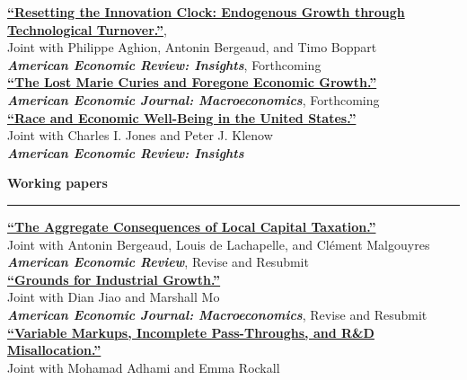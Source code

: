 \documentclass[12pt]{article}
\begin{document}
\begin{small}

\href{https://jfbrou.github.io/papers/ABBB_2025.pdf}{\textbf{``Resetting the Innovation Clock: Endogenous Growth through Technological Turnover.''}}, \\
Joint with Philippe Aghion, Antonin Bergeaud, and Timo Boppart \\
\textit{\textbf{American Economic Review: Insights}}, Forthcoming \\[-0.5\baselineskip]

\href{https://jfbrou.github.io/papers/hopper.pdf}{\textbf{``The Lost Marie Curies and Foregone Economic Growth.''}} \\
\textit{\textbf{American Economic Journal: Macroeconomics}}, Forthcoming \\[-0.5\baselineskip]

\href{http://klenow.com/BrouilletteJonesKlenow_Race_and_Welfare.pdf}{\textbf{``Race and Economic Well-Being in the United States.''}} \\
Joint with Charles I. Jones and Peter J. Klenow \\
\textit{\textbf{American Economic Review: Insights}}
\end{small}

\vspace{0.5cm}

{\large \textbf{Working papers}} \\
\noindent\rule[0.5\baselineskip]{\textwidth}{1pt}

\begin{small}

\href{https://jfbrou.github.io/papers/BBLM_2026.pdf}{\textbf{``The Aggregate Consequences of Local Capital Taxation.''}} \\
Joint with Antonin Bergeaud, Louis de Lachapelle, and Clément Malgouyres \\
\textit{\textbf{American Economic Review}}, Revise and Resubmit \\[-0.5\baselineskip]

\href{https://drive.google.com/file/d/1z8lTR8R5P9uCwSs1FLgQa9mQ6WbSRwEo/view}{\textbf{``Grounds for Industrial Growth.''}} \\
Joint with Dian Jiao and Marshall Mo \\
\textit{\textbf{American Economic Journal: Macroeconomics}}, Revise and Resubmit \\[-0.5\baselineskip]

\href{https://jfbrou.github.io/papers/markups.pdf}{\textbf{``Variable Markups, Incomplete Pass-Throughs, and R\&D Misallocation.''}} \\
Joint with Mohamad Adhami and Emma Rockall
\end{small}
\end{document}
